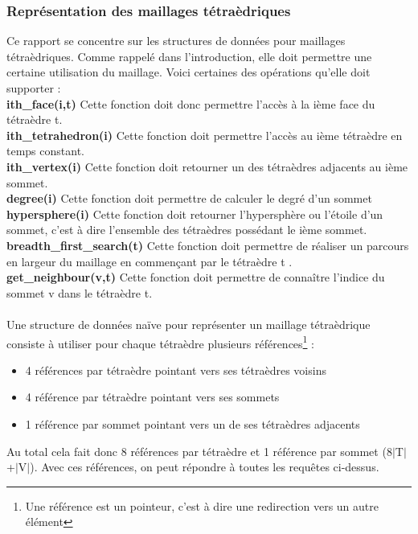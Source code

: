 \subsubsection{Représentation des maillages tétraèdriques}
\noindent
Ce rapport se concentre sur les structures de données pour maillages tétraèdriques. Comme rappelé dans l'introduction, elle doit permettre une certaine utilisation du maillage. Voici certaines des opérations qu'elle doit supporter :\\
\textbf{ith\_face(i,t)} Cette fonction doit donc permettre l'accès à la ième face du tétraèdre t. \\
\textbf{ith\_tetrahedron(i)} Cette fonction doit permettre l'accès au ième tétraèdre en temps constant.\\
\textbf{ith\_vertex(i)} Cette fonction doit retourner un des tétraèdres adjacents au ième sommet.\\ 
\textbf{degree(i)} Cette fonction doit permettre de calculer le degré d'un sommet\\
\textbf{hypersphere(i)} Cette fonction doit retourner l'hypersphère ou l'étoile d'un sommet, c'est à dire l'ensemble des tétraèdres possédant le ième sommet.\\
\textbf{breadth\_first\_search(t)} Cette fonction doit permettre de réaliser un parcours en largeur du maillage en commen\c cant par le tétraèdre t .\\
\textbf{get\_neighbour(v,t)} Cette fonction doit permettre de connaître l'indice du sommet v dans le tétraèdre t.\\\\
Une structure de données naïve pour représenter un maillage tétraèdrique consiste à utiliser pour chaque tétraèdre plusieurs références\footnote{Une référence est un pointeur, c'est à dire une redirection vers un autre élément} : 
\begin{itemize}
\item 4 références par tétraèdre pointant vers ses tétraèdres voisins
\item 4 référence par tétraèdre pointant vers ses sommets
\item 1 référence par sommet pointant vers un de ses tétraèdres adjacents
\end{itemize}
Au total cela fait donc 8 références par tétraèdre et 1 référence par sommet (8$|$T$|$+$|$V$|$). Avec ces références, on peut répondre à toutes les requêtes ci-dessus.